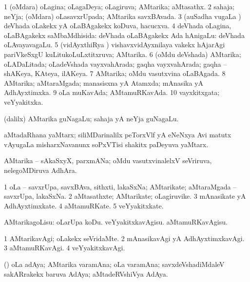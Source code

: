 \bentry
{}
\gl{\gu}
\bmng
\bnum
\num{1} (oMdara) oLagina; oLagaDeya; oLagiruva; AMtarika; aMtasathx. 
\num{2} sahaja; neYja; (oMdara) oLasavxrUpada; AMtarika savxBAvada. 
\num{3} (auSadha \mo vugaLa \vi) deVhada oLakekx yA oLaBAgakekx koDuva, hacucxva. 
\num{4} deVhada oLagina, oLaBAgakekx saMbaMdhisida:  deVhada oLaBAgakekx Ada hAnigaLu:  deVhada oLAvayavagaLu. 
\num{5} (vidAyxthiRya \vi) vishavxvidAyxnilaya \mo vakekx hAjarAgi pariVkeSxgU kuLitukoLuLxtitxruva; AMtarika. 
\num{6} (oMdu deVshada) AMtarika; oLADaLitada; oLadeVshada vayxvahArada; gaqha vayxvahArada; gaqha -- shAKeya, KAteya, ilAKeya. 
\num{7} AMtarika; oMdu vasutxvina oLaBAgada. 
\num{8} AMtarika; aMtaraMgada; manasisxna yA Atamxda; mAnasika yA AdhAyxtimxka. 
\num{9} oLa muKavAda; AMtamuRKavAda. 
\num{10} vayxkitxgata; veYyakitxka. 
\enum
\emng
\eentry

\bentry
{}
\gl{\nA}
\bmng
(\bava dalilx) AMtarika guNagaLu; sahaja yA neYja guNagaLu. 
\emng
\eentry

\bentry
{}
\gl{\nA}
\bmng
aMtadaRhana yaMtarx; siliMDarinalilx peTorxVlf yA eNeNxya Avi matutx vAyugaLa misharxNavanunx soPxVTisi shakitx paDeyuva yaMtarx. 
\emng
\eentry

\bentry
{}
\gl{\nA}
\bmng
AMtarika -- sAkaSxyX, parxmANa; oMdu vasutxvinalelxV seVriruva, nelegoMDiruva AdhAra. 
\emng
\eentry

\bentry
{}
\gl{\nA}
\bmng
\bnum
\num{1} oLa -- savxrUpa, savxBAva, sithxti, lakaSxNa; AMtarikate; aMtaraMgada -- savxrUpa, lakaSxNa. 
\num{2} aMtasathxte; AMtarikate; oLagiruvike. 
\num{3} mAnasikate yA AdhAyxtimxkate. 
\num{4} aMtamuRKate. 
\num{5} veYyakitxkate. 
\enum
\emng
\eentry

\bentry
{}
\gl{\sakirx}
\bmng
AMtarikagoLisu: 
\banum
{} oLarUpa koDu. 
 veYyakitxkavAgisu. 
 aMtamuRKavAgisu. 
\eanum
\emng
\eentry

\bentry
{}
\gl{\kirxvi}
\bmng
\bnum
\num{1} AMtarikavAgi; oLakekx seVridaMte. 
\num{2} mAnasikavAgi yA AdhAyxtimxkavAgi. 
\num{3} aMtamuRKavAgi. 
\num{4} veYyakitxkavAgi. 
\enum
\emng
\eentry

\bentry
{}
\gl{\nA}
\bmng
(\ame) oLa adAya; AMtarika varamAna; oLa varamAna; savxdeVshadiMdaleV sakARrakekx baruva AdAya; aMtadeRVshiVya AdAya. 
\emng
\eentry

